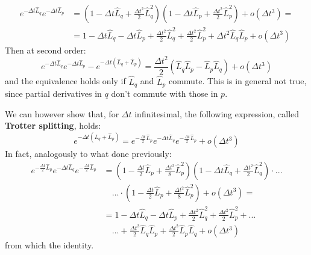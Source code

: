         \begin{align*}
            e^{-\Delta t \hat{L}_q}e^{-\Delta t \hat{L}_p}&=(1-\Delta t\hat{L}_q+\frac{\Delta t^2}{2}\hat{L}_q^2)(1-\Delta t\hat{L}_p+\frac{\Delta t^2}{2}\hat{L}_p^2)+o(\Delta t^3)=\\
            &= 1-\Delta t\hat{L}_q-\Delta t\hat{L}_p+\frac{\Delta t^2}{2}\hat{L}_q^2+\frac{\Delta t^2}{2}\hat{L}_p^2+\Delta t^2\hat{L}_q\hat{L}_p+o(\Delta t^3)
        \end{align*}
        Then at second order:
        \begin{equation}
            e^{-\Delta t \hat{L}_q}e^{-\Delta t \hat{L}_p}-e^{-\Delta t (\hat{L}_q+\hat{L}_p)}=\frac{\Delta t^2}{2}\left(\hat{L}_q\hat{L}_p-\hat{L}_p\hat{L}_q\right)+o(\Delta t^3)
        \end{equation}
        and the equivalence holds only if $\hat{L}_q$ and $\hat{L}_p$ commute. This is in general not true, since partial derivatives in $q$ don't commute with those in $p$.             
        
        We can however show that, for $\Delta t$ infinitesimal, the following expression, called \textbf{Trotter splitting}, holds:
        \begin{equation}\label{eq_trotter_splitting}
            e^{-\Delta t (\hat{L}_q+\hat{L}_p)}= e^{-\frac{\Delta t}{2} \hat{L}_p}e^{-\Delta t \hat{L}_q}e^{-\frac{\Delta t}{2} \hat{L}_p}+o(\Delta t^3)
        \end{equation}
        In fact, analogously to what done previously:
        \begin{align*}
             e^{-\frac{\Delta t}{2} \hat{L}_p}e^{-\Delta t \hat{L}_q}e^{-\frac{\Delta t}{2}\hat{L}_p}&= (1-\frac{\Delta t}{2}\hat{L}_p+\frac{\Delta t^2}{8}\hat{L}_p^2)(1-\Delta t\hat{L}_q+\frac{\Delta t^2}{2}\hat{L}_q^2)\cdot...\\&\quad...\cdot(1-\frac{\Delta t}{2}\hat{L}_p+\frac{\Delta t^2}{8}\hat{L}_p^2)+o(\Delta t^3)=\\
            &= 1-\Delta t\hat{L}_q-\Delta t\hat{L}_p+\frac{\Delta t^2}{2}\hat{L}_q^2+\frac{\Delta t^2}{2}\hat{L}_p^2+...\\&\quad ...+\frac{\Delta t^2}{2}\hat{L}_q\hat{L}_p+\frac{\Delta t^2}{2}\hat{L}_p\hat{L}_q+o(\Delta t^3)
        \end{align*}
        from which the identity.
        
